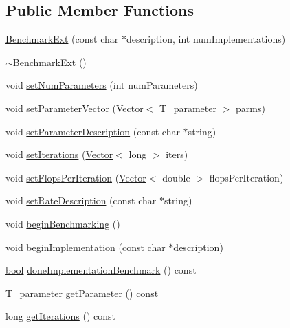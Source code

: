 \subsection*{Public Member Functions}
\begin{DoxyCompactItemize}
\item 
\hyperlink{classBenchmarkExt_a1a5b14c2e31e3fe37c27169be8087bc5}{Benchmark\+Ext} (const char $\ast$description, int num\+Implementations)
\item 
\hyperlink{classBenchmarkExt_af91c59a54f02d648bb018c2720f93819}{$\sim$\+Benchmark\+Ext} ()
\item 
void \hyperlink{classBenchmarkExt_ab74df38c62726bf13d0ecfc90d800c00}{set\+Num\+Parameters} (int num\+Parameters)
\item 
void \hyperlink{classBenchmarkExt_a3dfa7c135fc783ffbcae7b35b8b526aa}{set\+Parameter\+Vector} (\hyperlink{classVector}{Vector}$<$ \hyperlink{classBenchmarkExt_a8b17d300898ee83a0c10463c1b53cfa5}{T\+\_\+parameter} $>$ parms)
\item 
void \hyperlink{classBenchmarkExt_a6f5265a1e4ed60d8d857a3b46a434b5c}{set\+Parameter\+Description} (const char $\ast$string)
\item 
void \hyperlink{classBenchmarkExt_a8525237682dc47897abb8d6d414be331}{set\+Iterations} (\hyperlink{classVector}{Vector}$<$ long $>$ iters)
\item 
void \hyperlink{classBenchmarkExt_ab8188dedb93ad5178924b94274a14f7c}{set\+Flops\+Per\+Iteration} (\hyperlink{classVector}{Vector}$<$ double $>$ flops\+Per\+Iteration)
\item 
void \hyperlink{classBenchmarkExt_ac239788dd114923c82613dc0b3ccb0dc}{set\+Rate\+Description} (const char $\ast$string)
\item 
void \hyperlink{classBenchmarkExt_abf8d40a12c57994e3c47a2d127e069ce}{begin\+Benchmarking} ()
\item 
void \hyperlink{classBenchmarkExt_af8d3b582d9cc15bee2fa430b64dd7cd0}{begin\+Implementation} (const char $\ast$description)
\item 
\hyperlink{compiler_8h_abb452686968e48b67397da5f97445f5b}{bool} \hyperlink{classBenchmarkExt_ab6a85b279a40d018404eccf5c902ba97}{done\+Implementation\+Benchmark} () const 
\item 
\hyperlink{classBenchmarkExt_a8b17d300898ee83a0c10463c1b53cfa5}{T\+\_\+parameter} \hyperlink{classBenchmarkExt_ac118531363dcb4e37ca6c73fe8c652b2}{get\+Parameter} () const 
\item 
long \hyperlink{classBenchmarkExt_a03b0411a11416af48e6a53372d174088}{get\+Iterations} () const 

\end{DoxyCompactItemize}
